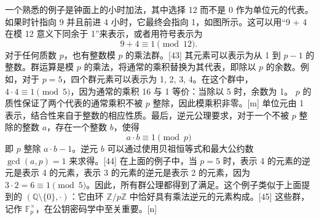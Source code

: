 一个熟悉的例子是钟面上的小时加法，其中选择 12 而不是 0 作为单位元的代表。如果时针指向 9 并且前进 4 小时，它最终会指向 1，如图所示。这可以用“9 + 4 在模 12 意义下同余于 1”来表示，或者用符号表示为  
\[
9 + 4 \equiv 1 \pmod{12}.~
\]
对于任何质数 \( p \)，也有整数模 \( p \) 的乘法群。[43] 其元素可以表示为从 1 到 \( p - 1 \) 的整数。群运算是模 \( p \) 的乘法，将通常的乘积替换为其代表，即除以 \( p \) 的余数。例如，对于 \( p = 5 \)，四个群元素可以表示为 1, 2, 3, 4。在这个群中，\( 4 \cdot 4 \equiv 1 \pmod{5} \)，因为通常的乘积 16 与 1 等价：当除以 5 时，余数为 1。 \( p \) 的质性保证了两个代表的通常乘积不被 \( p \) 整除，因此模乘积非零。[m] 单位元由 1 表示，结合性来自于整数的相应性质。最后，逆元公理要求，对于一个不被 \( p \) 整除的整数 \( a \)，存在一个整数 \( b \)，使得  
\[
a \cdot b \equiv 1 \pmod{p}~
\]
即 \( p \) 整除 \( a \cdot b - 1 \)。逆元 \( b \) 可以通过使用贝祖恒等式和最大公约数 \( \gcd(a, p) = 1 \) 来求得。[44] 在上面的例子中，当 \( p = 5 \) 时，表示 4 的元素的逆元是表示 4 的元素，表示 3 的元素的逆元是表示 2 的元素，因为 \( 3 \cdot 2 = 6 \equiv 1 \pmod{5} \)。因此，所有群公理都得到了满足。这个例子类似于上面提到的 \( (\mathbb{Q} \setminus \{0\}, \cdot) \)：它由环 \( \mathbb{Z}/p\mathbb{Z} \) 中恰好具有乘法逆元的元素构成。[45] 这些群，记作 \( \mathbb{F}_p^\times \)，在公钥密码学中至关重要。[n]